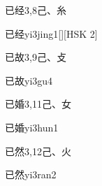 \begin{Entry}{已经}{3,8}{⼰、⽷}
  \begin{Phonetics}{已经}{yi3jing1}[][HSK 2]
  \end{Phonetics}
\end{Entry}

\begin{Entry}{已故}{3,9}{⼰、⽁}
  \begin{Phonetics}{已故}{yi3gu4}
  \end{Phonetics}
\end{Entry}

\begin{Entry}{已婚}{3,11}{⼰、⼥}
  \begin{Phonetics}{已婚}{yi3hun1}
  \end{Phonetics}
\end{Entry}

\begin{Entry}{已然}{3,12}{⼰、⽕}
  \begin{Phonetics}{已然}{yi3ran2}
  \end{Phonetics}
\end{Entry}

